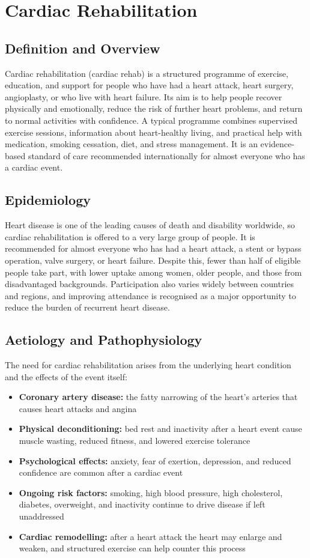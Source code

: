 \chapter{Cardiac Rehabilitation}

\section*{Definition and Overview}
Cardiac rehabilitation (cardiac rehab) is a structured programme of exercise, education, and support for people who have had a heart attack, heart surgery, angioplasty, or who live with heart failure. Its aim is to help people recover physically and emotionally, reduce the risk of further heart problems, and return to normal activities with confidence. A typical programme combines supervised exercise sessions, information about heart-healthy living, and practical help with medication, smoking cessation, diet, and stress management. It is an evidence-based standard of care recommended internationally for almost everyone who has a cardiac event.

\section*{Epidemiology}
Heart disease is one of the leading causes of death and disability worldwide, so cardiac rehabilitation is offered to a very large group of people. It is recommended for almost everyone who has had a heart attack, a stent or bypass operation, valve surgery, or heart failure. Despite this, fewer than half of eligible people take part, with lower uptake among women, older people, and those from disadvantaged backgrounds. Participation also varies widely between countries and regions, and improving attendance is recognised as a major opportunity to reduce the burden of recurrent heart disease.

\section*{Aetiology and Pathophysiology}
The need for cardiac rehabilitation arises from the underlying heart condition and the effects of the event itself:
\begin{itemize}
    \item \textbf{Coronary artery disease:} the fatty narrowing of the heart's arteries that causes heart attacks and angina
    \item \textbf{Physical deconditioning:} bed rest and inactivity after a heart event cause muscle wasting, reduced fitness, and lowered exercise tolerance
    \item \textbf{Psychological effects:} anxiety, fear of exertion, depression, and reduced confidence are common after a cardiac event
    \item \textbf{Ongoing risk factors:} smoking, high blood pressure, high cholesterol, diabetes, overweight, and inactivity continue to drive disease if left unaddressed
    \item \textbf{Cardiac remodelling:} after a heart attack the heart may enlarge and weaken, and structured exercise can help counter this process
\end{itemize}

